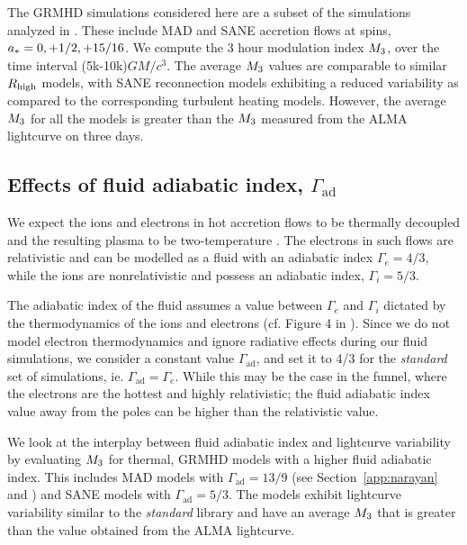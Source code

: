 The GRMHD simulations considered here are a subset of the simulations analyzed in \citealt{2020MNRAS.494.4168D}. These include MAD and SANE accretion flows at spins, $a_* = 0,+1/2,+15/16$. We compute the 3 hour modulation index $M_{3}$, over the time interval (5k-10k)$GM/c^{3}$. The average $M_{3}$ values are comparable to similar $R_\mathrm{high}$ models, with SANE reconnection models exhibiting a reduced variability as compared to the corresponding turbulent heating models. However, the average $M_{3}$ for all the models is greater than the $M_{3}$ measured from the ALMA lightcurve on three days.

\subsection{Effects of fluid adiabatic index, \texorpdfstring{$\Gamma_\mathrm{ad}$}{Gad}}

We expect the ions and electrons in hot accretion flows to be thermally decoupled and the resulting plasma to be two-temperature \citep{1976ApJ...204..187S, Quataert_1998, 10.1093/mnras/stw3116, Ryan_2018, Chael2018}. The electrons in such flows are relativistic and can be modelled as a fluid with an adiabatic index $\Gamma_{e}=4/3$, while the ions are nonrelativistic and possess an adiabatic index, $\Gamma_{i}=5/3$.

The adiabatic index of the fluid assumes a value between $\Gamma_{e}$ and $\Gamma_{i}$ dictated by the thermodynamics of the ions and electrons (cf. Figure 4 in \citealt{10.1093/mnras/stw3116}). Since we do not model electron thermodynamics and ignore radiative effects during our fluid simulations, we consider a constant value $\Gamma_\mathrm{ad}$, and set it to 4/3 for the \textit{standard} set of simulations, ie. $\Gamma_\mathrm{ad}=\Gamma_{e}$. While this may be the case in the funnel, where the electrons are the hottest and highly relativistic; the fluid adiabatic index value away from the poles can be higher than the relativistic value.

We look at the interplay between fluid adiabatic index and lightcurve variability by evaluating $M_{3}$ for thermal, GRMHD models with a higher fluid adiabatic index. This includes MAD models with $\Gamma_\mathrm{ad}=13/9$ (see Section~\ref{app:narayan} and  \citealt{2021arXiv210812380N}) and SANE models with $\Gamma_\mathrm{ad}=5/3$. The models exhibit lightcurve variability similar to the \textit{standard} library and have an average $M_{3}$ that is greater than the value obtained from the ALMA lightcurve.
